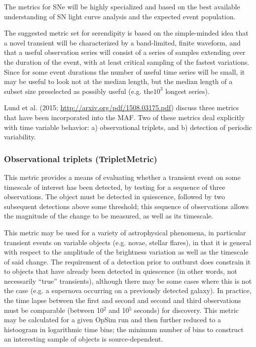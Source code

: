 The metrics for SNe will be highly specialized and based on the best available understanding of SN light curve analysis and the expected event population.

The suggested metric set for serendipity is based on the simple-minded idea that a novel transient will be characterized by a band-limited, finite waveform, and that a useful observation series will consist of a series of samples extending over the duration of the event, with at least critical sampling of the fastest variations.  Since for some event durations the number of useful time series will be small, it may be useful to look not at the median length, but the median length of a subset size preselected as possibly useful (e.g. the$10^3$ longest series).

Lund et al. (2015; \url{http://arxiv.org/pdf/1508.03175.pdf}) discuss three metrics that have been incorporated into the MAF. Two of these metrics deal explicitly with time variable behavior: a) observational triplets, and b) detection of periodic variability. 

\subsubsection{Observational triplets (TripletMetric)}

This metric provides a means of evaluating whether a transient event on some timescale of interest has been detected, by testing for a sequence of three observations. The object must be detected in quiescence, followed by two subsequent detections above some threshold; this sequence of observations allows the magnitude of the change to be measured, as well as its timescale. 

This metric may be used for a variety of astrophysical phenomena, in particular transient events on variable objects (e.g. novae, stellar flares), in that it is general with respect to the amplitude of the brightness variation as well as the timescale of said change. The requirement of a detection prior to outburst does constrain it to objects that have already been detected in quiescence (in other words, not necessarily ``true'' transients), although there may be some cases where this is not the case (e.g. a supernova occurring on a previously detected galaxy). In practice, the time lapse between the first and second and second and third observations must be comparable (between 10$^2$ and 10$^5$ seconds) for discovery. This metric may be calculated for a given OpSim run and then further reduced to a histoogram in logarithmic time bins; the minimum number of bins to construct an interesting sample of objects is source-dependent. 

